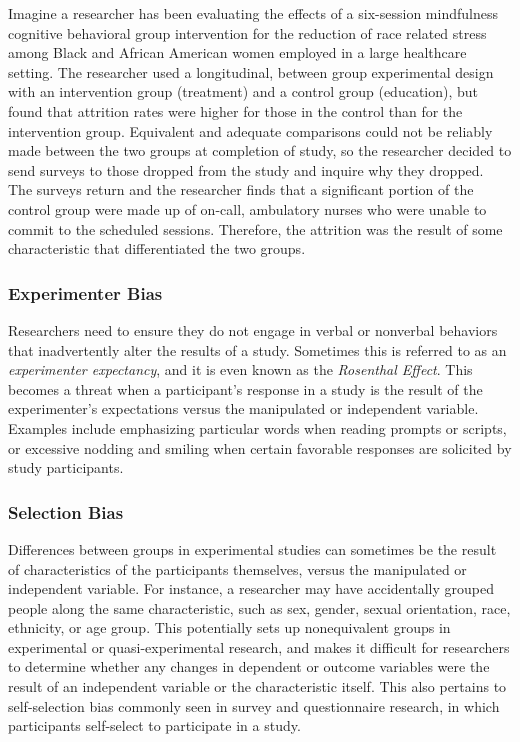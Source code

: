 \documentclass[
  11pt,
]{book}
\newcounter{none} %
\begin{document}
Imagine a researcher has been evaluating the effects of a six-session mindfulness cognitive behavioral group intervention for the reduction of race related stress among Black and African American women employed in a large healthcare setting. The researcher used a longitudinal, between group experimental design with an intervention group (treatment) and a control group (education), but found that attrition rates were higher for those in the control than for the intervention group. Equivalent and adequate comparisons could not be reliably made between the two groups at completion of study, so the researcher decided to send surveys to those dropped from the study and inquire why they dropped. The surveys return and the researcher finds that a significant portion of the control group were made up of on-call, ambulatory nurses who were unable to commit to the scheduled sessions. Therefore, the attrition was the result of some characteristic that differentiated the two groups.

\subsubsection{Experimenter Bias}\label{experimenter-bias}

Researchers need to ensure they do not engage in verbal or nonverbal behaviors that inadvertently alter the results of a study. Sometimes this is referred to as an \emph{experimenter expectancy}, and it is even known as the \emph{Rosenthal Effect}. This becomes a threat when a participant's response in a study is the result of the experimenter's expectations versus the manipulated or independent variable. Examples include emphasizing particular words when reading prompts or scripts, or excessive nodding and smiling when certain favorable responses are solicited by study participants.

\subsubsection{Selection Bias}\label{selection-bias}

Differences between groups in experimental studies can sometimes be the result of characteristics of the participants themselves, versus the manipulated or independent variable. For instance, a researcher may have accidentally grouped people along the same characteristic, such as sex, gender, sexual orientation, race, ethnicity, or age group. This potentially sets up nonequivalent groups in experimental or quasi-experimental research, and makes it difficult for researchers to determine whether any changes in dependent or outcome variables were the result of an independent variable or the characteristic itself. This also pertains to self-selection bias commonly seen in survey and questionnaire research, in which participants self-select to participate in a study.
\end{document}

